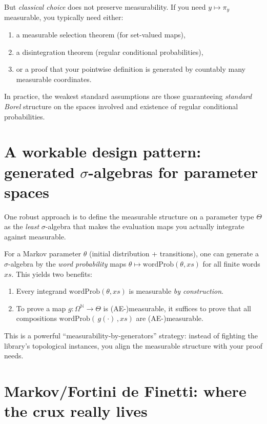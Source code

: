 \documentclass[11pt]{article}
\newcommand{\NN}{\mathbb{N}}
\begin{document}
But \emph{classical choice} does not preserve measurability. If you need $y\mapsto \pi_y$ measurable,
you typically need either:
\begin{enumerate}[label=(\roman*)]
\item a measurable selection theorem (for set-valued maps),
\item a disintegration theorem (regular conditional probabilities),
\item or a proof that your pointwise definition is generated by countably many measurable coordinates.
\end{enumerate}

In practice, the weakest standard assumptions are those guaranteeing \emph{standard Borel} structure
on the spaces involved and existence of regular conditional probabilities.

\section{A workable design pattern: generated $\sigma$-algebras for parameter spaces}

One robust approach is to define the measurable structure on a parameter type $\Theta$ as the
\emph{least} $\sigma$-algebra that makes the evaluation maps you actually integrate against
measurable.

For a Markov parameter $\theta$ (initial distribution + transitions), one can generate a
$\sigma$-algebra by the \emph{word probability} maps
$\theta \mapsto \mathrm{wordProb}(\theta, xs)$ for all finite words $xs$.
This yields two benefits:

\begin{enumerate}[label=(\alph*)]
\item Every integrand $\mathrm{wordProb}(\theta, xs)$ is measurable \emph{by construction}.
\item To prove a map $g : \Omega^\NN \to \Theta$ is (AE-)measurable, it suffices to prove that all
compositions $\mathrm{wordProb}(\,g(\cdot)\,, xs)$ are (AE-)measurable.
\end{enumerate}

This is a powerful ``measurability-by-generators'' strategy: instead of fighting the library's
topological instances, you align the measurable structure with your proof needs.

\section{Markov/Fortini de Finetti: where the crux really lives}
\end{document}
